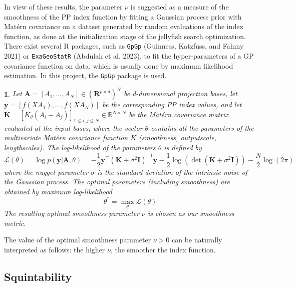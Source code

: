 \documentclass[
  12pt,
]{interact}
\theoremstyle{plain}
\newtheorem{defn}{\protect\definitionname}
\providecommand{\definitionname}{Definition}
\begin{document}
In view of these results, the parameter \(\nu\) is suggested as a
measure of the smoothness of the PP index function by fitting a Gaussian
process prior with Matérn covariance on a dataset generated by random
evaluations of the index function, as done at the initialization stage
of the jellyfish search optimization. There exist several R packages,
such as \texttt{GpGp} (Guinness, Katzfuss, and Fahmy 2021) or
\texttt{ExaGeoStatR} (Abdulah et al. 2023), to fit the hyper-parameters
of a GP covariance function on data, which is usually done by maximum
likelihood estimation. In this project, the \texttt{GpGp} package is
used.

\begin{defn}
Let $\mathbf{A}=[A_1, \ldots, A_N] \in (\mathbf{R}^{p \times d})^N$ be d-dimensional projection bases, let $\mathbf{y}=[f(XA_1),\ldots,f(XA_N)]$ be the corresponding PP index values, and let $\mathbf{K}=[K_\theta(A_{i}-A_{j})]_{1\leq i,j\leq N}\in\mathbb{R}^{N\times N}$ be the Matérn covariance matrix evaluated at the input bases, where the vector $\theta$ contains all the parameters of the multivariate Matérn covariance function $K$ (smoothness, outputscale, lengthscales). The log-likelihood of the parameters $\theta$ is defined by 
\begin{equation}
\mathcal{L}(\theta)=\log p(\mathbf{y}\left|\mathbf{A},\theta\right.)=-\frac{1}{2}\mathbf{y}^{\top}(\mathbf{K}+\sigma^{2}\mathbf{I})^{-1}\mathbf{y}-\frac{1}{2}\mathrm{\log}(\det(\mathbf{K}+\sigma^{2}\mathbf{I}))-\frac{N}{2}\log(2\pi)\, \label{eq:gp_log_likelihood}
\end{equation}
where the nugget parameter $\sigma$ is the standard deviation of the intrinsic noise of the Gaussian process.
The optimal parameters (including smoothness) are obtained by maximum log-likelihood
\begin{equation}
\theta^* = \underset{\theta}{\max}\mathcal{L}(\theta)
\end{equation}
The resulting optimal smoothness parameter $\nu$ is chosen as our smoothness metric.
\end{defn}

The value of the optimal smoothness parameter \(\nu>0\) can be naturally
interpreted as follows: the higher \(\nu\), the smoother the index
function.

\hypertarget{sec-squintability}{%
\subsection{Squintability}\label{sec-squintability}}
\end{document}
